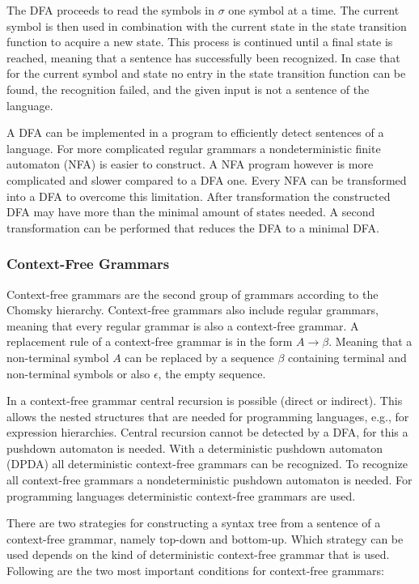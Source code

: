 The DFA proceeds to read the symbols in $\sigma$ one symbol at a time. The current symbol is then used in combination with the current state in the state transition function to acquire a new state. This process is continued until a final state is reached, meaning that a sentence has successfully been recognized. In case that for the current symbol and state no entry in the state transition function can be found, the recognition failed, and the given input is not a sentence of the language. 

A DFA can be implemented in a program to efficiently detect sentences of a language. For more complicated regular grammars a nondeterministic finite automaton (NFA) is easier to construct. A NFA program however is more complicated and slower compared to a DFA one. Every NFA can be transformed into a DFA to overcome this limitation. After transformation the constructed DFA may have more than the minimal amount of states needed. A second transformation can be performed that reduces the DFA to a minimal DFA. 

\subsubsection{Context-Free Grammars}

Context-free grammars are the second group of grammars according to the Chomsky hierarchy. Context-free grammars also include regular grammars, meaning that every regular grammar is also a context-free grammar. A replacement rule of a context-free grammar is in the form $A \rightarrow \beta$. Meaning that a non-terminal symbol $A$ can be replaced by a sequence $\beta$ containing terminal and non-terminal symbols or also $\epsilon$, the empty sequence. 

In a context-free grammar central recursion is possible (direct or indirect). This allows the nested structures that are needed for programming languages, e.g., for expression hierarchies. Central recursion cannot be detected by a DFA, for this a pushdown automaton is needed. With a deterministic pushdown automaton (DPDA) all deterministic context-free grammars can be recognized. To recognize all context-free grammars a nondeterministic pushdown automaton is needed. For programming languages deterministic context-free grammars are used. 

There are two strategies for constructing a syntax tree from a sentence of a context-free grammar, namely top-down and bottom-up. Which strategy can be used depends on the kind of deterministic context-free grammar that is used. Following are the two most important conditions for context-free grammars:

